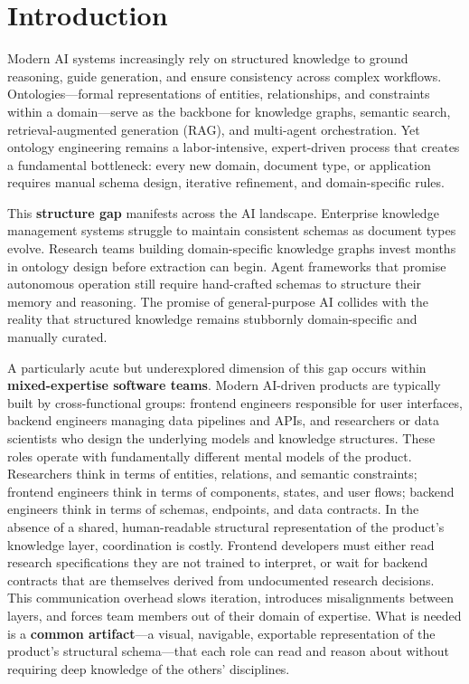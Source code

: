 \documentclass[runningheads,a4paper]{llncs}
\begin{document}
\section{Introduction}
\label{sec:intro}

Modern AI systems increasingly rely on structured knowledge to ground
reasoning, guide generation, and ensure consistency across complex
workflows. Ontologies---formal representations of entities,
relationships, and constraints within a domain---serve as the backbone
for knowledge graphs, semantic search, retrieval-augmented generation
(RAG), and multi-agent orchestration. Yet ontology engineering remains a
labor-intensive, expert-driven process that creates a fundamental
bottleneck: every new domain, document type, or application requires
manual schema design, iterative refinement, and domain-specific rules.

This \textbf{structure gap} manifests across the AI landscape.
Enterprise knowledge management systems struggle to maintain consistent
schemas as document types evolve. Research teams building
domain-specific knowledge graphs invest months in ontology design before
extraction can begin. Agent frameworks that promise autonomous operation
still require hand-crafted schemas to structure their memory and
reasoning. The promise of general-purpose AI collides with the reality
that structured knowledge remains stubbornly domain-specific and
manually curated.

A particularly acute but underexplored dimension of this gap occurs
within \textbf{mixed-expertise software teams}. Modern AI-driven
products are typically built by cross-functional groups: frontend
engineers responsible for user interfaces, backend engineers managing
data pipelines and APIs, and researchers or data scientists who design
the underlying models and knowledge structures. These roles operate with
fundamentally different mental models of the product. Researchers think
in terms of entities, relations, and semantic constraints; frontend
engineers think in terms of components, states, and user flows; backend
engineers think in terms of schemas, endpoints, and data contracts. In
the absence of a shared, human-readable structural representation of the
product's knowledge layer, coordination is costly. Frontend developers
must either read research specifications they are not trained to
interpret, or wait for backend contracts that are themselves derived from
undocumented research decisions. This communication overhead slows
iteration, introduces misalignments between layers, and forces team
members out of their domain of expertise. What is needed is a
\textbf{common artifact}---a visual, navigable, exportable
representation of the product's structural schema---that each role can
read and reason about without requiring deep knowledge of the others'
disciplines.
\end{document}
